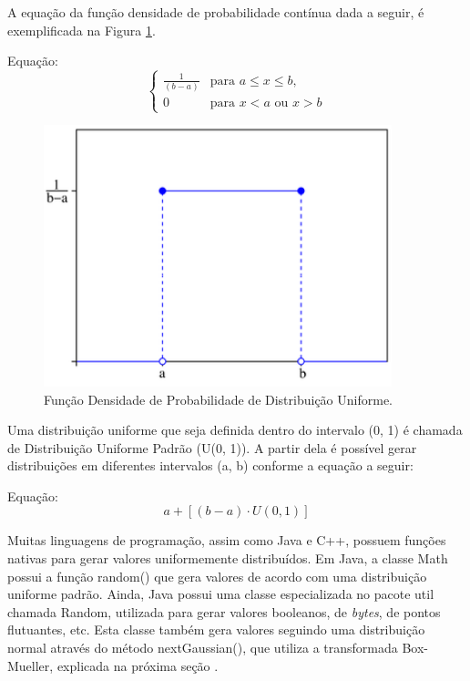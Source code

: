 A equação da função densidade de probabilidade contínua dada a seguir, é exemplificada na Figura \ref{fig:uniformdist}.

Equação: \[\left\{\begin{matrix}
\frac{1}{(b-a)} & \mbox{para } a \leqslant x \leqslant b,\\ 
0 & \mbox{para } x < a \mbox{ ou } x > b
\end{matrix}\right.\]

\begin{figure}[!htb]
	\centering
	\includegraphics[width=0.9\textwidth]{./imgs/uniformdist.png}
	\caption{Função Densidade de Probabilidade de Distribuição Uniforme.}
	\label{fig:uniformdist}
\end{figure}

Uma distribuição uniforme que seja definida dentro do intervalo (0, 1) é chamada de Distribuição Uniforme Padrão (U(0, 1)). A partir dela é possível gerar distribuições em diferentes intervalos (a, b) conforme a equação a seguir:

Equação: \[a+[(b-a) \cdot U(0, 1)]\]

Muitas linguagens de programação, assim como Java e C++, possuem funções nativas para gerar valores uniformemente distribuídos. Em Java, a classe Math possui a função random() que gera valores de acordo com uma distribuição uniforme padrão. Ainda, Java possui uma classe especializada no pacote util chamada Random, utilizada para gerar valores booleanos, de \emph{bytes}, de pontos flutuantes, etc. Esta classe também gera valores seguindo uma distribuição normal através do método nextGaussian(), que utiliza a transformada Box-Mueller, explicada na próxima seção \cite{javaapi}. 

